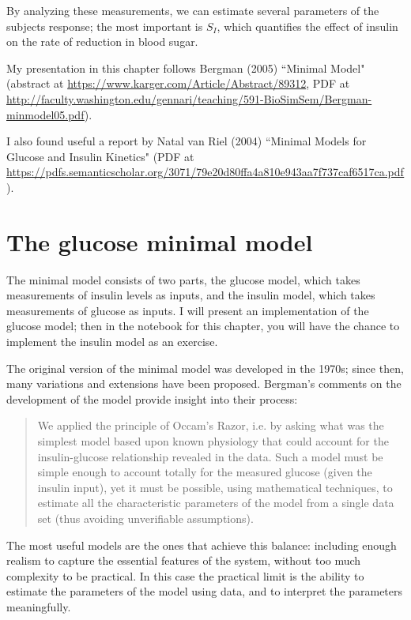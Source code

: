 \documentclass[12pt]{book}
\theoremstyle{exercise}
\begin{document}
By analyzing these measurements, we can estimate several parameters of the subjects response; the most important is $S_I$, which quantifies the effect of insulin on the rate of reduction in blood sugar.

My presentation in this chapter follows Bergman (2005) ``Minimal Model" (abstract at \url{https://www.karger.com/Article/Abstract/89312}, PDF at \url{http://faculty.washington.edu/gennari/teaching/591-BioSimSem/Bergman-minmodel05.pdf}).

I also found useful a report by Natal van Riel (2004) ``Minimal Models for Glucose and Insulin Kinetics" (PDF at \url{https://pdfs.semanticscholar.org/3071/79e20d80ffa4a810e943aa7f737caf6517ca.pdf}).



\section{The glucose minimal model}

The minimal model consists of two parts, the glucose model, which takes measurements of insulin levels as inputs, and the insulin model, which takes measurements of glucose as inputs.  I will present an implementation of the glucose model; then in the notebook for this chapter, you will have the chance to implement the insulin model as an exercise.

The original version of the minimal model was developed in the 1970s; since then, many variations and extensions have been proposed.  Bergman's comments on the development of the model provide insight into their process:

\begin{quote}
We applied the principle of Occam’s Razor, i.e. by asking
what was the simplest model based upon known physiology
that could account for the insulin-glucose relationship
revealed in the data. Such a model must be simple
enough to account totally for the measured glucose (given
the insulin input), yet it must be possible, using mathematical
techniques, to estimate all the characteristic parameters
of the model from a single data set (thus avoiding
unverifiable assumptions).
\end{quote}

The most useful models are the ones that achieve this balance: including enough realism to capture the essential features of the system, without too much complexity to be practical.  In this case the practical limit is the ability to estimate the parameters of the model using data, and to interpret the parameters meaningfully.
\end{document}
